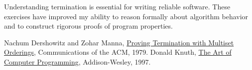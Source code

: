 \documentclass{article}
\theoremstyle{plain}
\theoremstyle{definition}
\theoremstyle{remark}
\begin{document}
Understanding termination is essential for writing reliable software. These exercises have improved my ability to reason formally about algorithm behavior and to construct rigorous proofs of program properties.

\begin{thebibliography}{99}
 Nachum Dershowitz and Zohar Manna, \href{https://en.wikipedia.org/wiki/Termination_analysis}{Proving Termination with Multiset Orderings}, Communications of the ACM, 1979.
 Donald Knuth, \href{https://en.wikipedia.org/wiki/Euclidean_algorithm}{The Art of Computer Programming}, Addison-Wesley, 1997.
\end{thebibliography}
\end{document}
